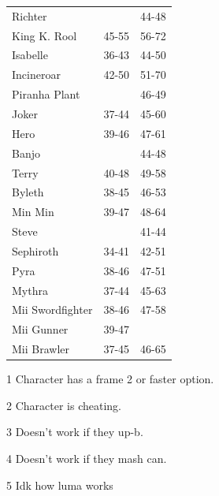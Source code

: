 \begin{table}[h]
\begin{subtable}[t]{.45\linewidth}
\begin{tabular}{lcc}
            Richter           &                & 44-48 \\
            King K. Rool      & 45-55          & 56-72 \\
            Isabelle          & 36-43          & 44-50 \\
            Incineroar        & 42-50          & 51-70 \\
            Piranha Plant     &                & 46-49 \\
            Joker             & 37-44          & 45-60 \\
            Hero              & 39-46          & 47-61 \\
            Banjo             &                & 44-48 \\
            Terry             & 40-48          & 49-58 \\
            Byleth            & 38-45          & 46-53 \\
            Min Min           & 39-47          & 48-64 \\
            Steve             &                & 41-44 \\
            Sephiroth         & 34-41          & 42-51 \\
            Pyra              & 38-46          & 47-51 \\
            Mythra            & 37-44\tnote{1} & 45-63 \\
            Mii Swordfighter  & 38-46          & 47-58 \\
            Mii Gunner        & 39-47          &       \\
            Mii Brawler       & 37-45\tnote{1} & 46-65 \\
            \bottomrule
        \end{tabular}
        \begin{tablenotes}
            \item[1] Character has a frame 2 or faster option.
            \item[2] Character is cheating.
            \item[3] Doesn't work if they up-b.
            \item[4] Doesn't work if they mash can.
            \item[5] Idk how luma works
        \end{tablenotes}
    \end{subtable}
\end{table}


